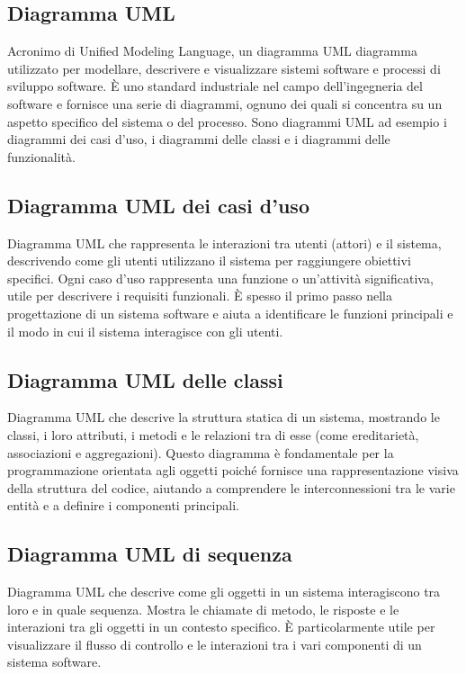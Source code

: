 \hypertarget{sec:diagramma_UML}{}
\subsection*{Diagramma UML}
Acronimo di Unified Modeling Language, un diagramma UML diagramma utilizzato per modellare, descrivere e visualizzare sistemi software e processi di sviluppo 
software. È uno standard industriale nel campo dell’ingegneria del software e fornisce una serie di diagrammi, ognuno dei quali si concentra su un aspetto 
specifico del sistema o del processo. Sono diagrammi UML ad esempio i diagrammi dei casi d’uso, i diagrammi delle classi e i diagrammi delle funzionalità.

\subsection*{Diagramma UML dei casi d'uso}
Diagramma UML che rappresenta le interazioni tra utenti (attori) e il sistema, descrivendo come gli utenti utilizzano il sistema per raggiungere obiettivi 
specifici. Ogni caso d'uso rappresenta una funzione o un'attività significativa, utile per descrivere i requisiti funzionali. È spesso il primo passo nella 
progettazione di un sistema software e aiuta a identificare le funzioni principali e il modo in cui il sistema interagisce con gli utenti.

\subsection*{Diagramma UML delle classi}
Diagramma UML che descrive la struttura statica di un sistema, mostrando le classi, i loro attributi, i metodi e le relazioni tra di esse (come ereditarietà, 
associazioni e aggregazioni). Questo diagramma è fondamentale per la programmazione orientata agli oggetti poiché fornisce una rappresentazione visiva della 
struttura del codice, aiutando a comprendere le interconnessioni tra le varie entità e a definire i componenti principali.

\hypertarget{sec:diagramma_uml_sequenza}{}
\subsection*{Diagramma UML di sequenza}
Diagramma UML che descrive come gli oggetti in un sistema interagiscono tra loro e in quale sequenza. Mostra le chiamate di metodo, le risposte e le interazioni
tra gli oggetti in un contesto specifico. È particolarmente utile per visualizzare il flusso di controllo e le interazioni tra i vari componenti di un sistema
software.

